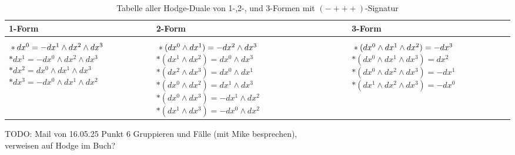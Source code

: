 \begin{table}[htbp]
	\centering
	\begin{tabularx}{\textwidth}{ 
			| >{\centering\arraybackslash}X 
			| >{\centering\arraybackslash}X 
			| >{\centering\arraybackslash}X | }
		\hline
		\textbf{1-Form} & \textbf{2-Form} & \textbf{3-Form} \\
		\hline
		\( \rule{0pt}{1.5em} *dx^0 = -dx^1 \wedge dx^2 \wedge dx^3 \) \newline
		\( *dx^1 = -dx^0 \wedge dx^2 \wedge dx^3 \) \newline
		\( *dx^2 =  dx^0 \wedge dx^1 \wedge dx^3 \) \newline
		\( *dx^3 = -dx^0 \wedge dx^1 \wedge dx^2 \) 
		&
		\( \rule{0pt}{1.5em} *(dx^0 \wedge dx^1) = -dx^2 \wedge dx^3 \) \newline
		\( *(dx^1 \wedge dx^2) = dx^0 \wedge dx^3 \) \newline
		\( *(dx^2 \wedge dx^3) = dx^0 \wedge dx^1 \) \newline
		\( *(dx^0 \wedge dx^2) = dx^1 \wedge dx^3 \) \newline
		\( *(dx^0 \wedge dx^3) = -dx^1 \wedge dx^2 \) \newline
		\( *(dx^1 \wedge dx^3) = -dx^0 \wedge dx^2 \)
		&
		\( \rule{0pt}{1.5em} *(dx^0 \wedge dx^1 \wedge dx^2) = -dx^3 \) \newline
		\( *(dx^0 \wedge dx^1 \wedge dx^3) = dx^2 \) \newline
		\( *(dx^0 \wedge dx^2 \wedge dx^3) = -dx^1 \) \newline
		\( *(dx^1 \wedge dx^2 \wedge dx^3) = -dx^0 \)
		\\
		\hline
	\end{tabularx}
	\caption{Tabelle aller Hodge-Duale von 1-,2-, und 3-Formen mit $(-+++)$-Signatur}
	\label{maxwell:section:teil1:Hodge-Tabelle}
\end{table}


TODO:
Mail von 16.05.25 Punkt 6 Gruppieren und Fälle (mit Mike besprechen),\\
verweisen auf Hodge im Buch?





